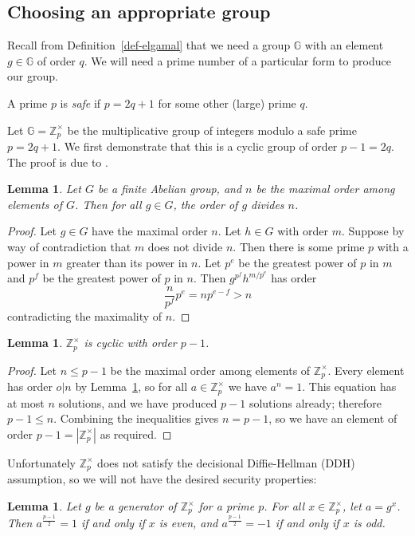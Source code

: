 \documentclass[12pt,a4paper]{article}
\newtheorem{lemma}[theorem]{Lemma}
\theoremstyle{definition}
\begin{document}
\subsection{Choosing an appropriate group}
Recall from Definition~\ref{def-elgamal} that we need a group $\mathbb{G}$ with an element $g\in\mathbb{G}$ of order $q$. We will need a prime number of a particular form to produce our group.
\begin{definition}
    A prime $p$ is \textit{safe} if $p=2q+1$ for some other (large) prime $q$.
\end{definition}
Let $\mathbb{G}=\mathbb{Z}^\times_p$ be the multiplicative group of integers modulo a safe prime $p=2q+1$. We first demonstrate that this is a cyclic group of order $p-1=2q$. The proof is due to \cite{cyclicity}.
\begin{lemma}\label{lem-order-divides}
    Let $G$ be a finite Abelian group, and $n$ be the maximal order among elements of $G$. Then for all $g\in G$, the order of $g$ divides $n$.
\end{lemma}
\begin{proof}
    Let $g\in G$ have the maximal order $n$. Let $h\in G$ with order $m$. Suppose by way of contradiction that $m$ does not divide $n$. Then there is some prime $p$ with a power in $m$ greater than its power in $n$. Let $p^e$ be the greatest power of $p$ in $m$ and $p^f$ be the greatest power of $p$ in $n$. Then $g^{p^f}h^{m/p^e}$ has order
    $$\frac{n}{p^f}p^e=np^{e-f}>n$$
    contradicting the maximality of $n$.
\end{proof}
\begin{lemma}
    $\mathbb{Z}^\times_p$ is cyclic with order $p-1$.
\end{lemma}
\begin{proof}
    Let $n\leq p-1$ be the maximal order among elements of $\mathbb{Z}^\times_p$. Every element has order $o\vert n$ by Lemma~\ref{lem-order-divides}, so for all $a\in\mathbb{Z}^\times_p$ we have $a^n=1$. This equation has at most $n$ solutions, and we have produced $p-1$ solutions already; therefore $p-1\leq n$.
    Combining the inequalities gives $n=p-1$, so we have an element of order $p-1=|\mathbb{Z}^\times_p|$ as required.
\end{proof}
Unfortunately $\mathbb{Z}^\times_p$ does not satisfy the decisional Diffie-Hellman (DDH) assumption, so we will not have the desired security properties:
\begin{lemma}\label{lem-parity}
    Let $g$ be a generator of $\mathbb{Z}^\times_p$ for a prime $p$. For all $x\in\mathbb{Z}^\times_p$, let $a=g^x$. Then $a^{\frac{p-1}{2}} = 1$ if and only if $x$ is even, and $a^{\frac{p-1}{2}} = -1$ if and only if $x$ is odd.
\end{lemma}
\end{document}

